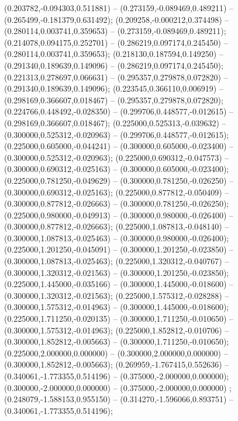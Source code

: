  (0.203782,-0.094303,0.511881) -- (0.273159,-0.089469,0.489211) -- (0.265499,-0.181379,0.631492);
 (0.209258,-0.000212,0.374498) -- (0.280114,0.003741,0.359653) -- (0.273159,-0.089469,0.489211);
 (0.214078,0.094175,0.252701) -- (0.286219,0.097174,0.245450) -- (0.280114,0.003741,0.359653);
 (0.218130,0.187594,0.149250) -- (0.291340,0.189639,0.149096) -- (0.286219,0.097174,0.245450);
 (0.221313,0.278697,0.066631) -- (0.295357,0.279878,0.072820) -- (0.291340,0.189639,0.149096);
 (0.223545,0.366110,0.006919) -- (0.298169,0.366607,0.018467) -- (0.295357,0.279878,0.072820);
 (0.224766,0.448492,-0.028350) -- (0.299706,0.448577,-0.012615) -- (0.298169,0.366607,0.018467);
 (0.225000,0.525313,-0.039632) -- (0.300000,0.525312,-0.020963) -- (0.299706,0.448577,-0.012615);
 (0.225000,0.605000,-0.044241) -- (0.300000,0.605000,-0.023400) -- (0.300000,0.525312,-0.020963);
 (0.225000,0.690312,-0.047573) -- (0.300000,0.690312,-0.025163) -- (0.300000,0.605000,-0.023400);
 (0.225000,0.781250,-0.049629) -- (0.300000,0.781250,-0.026250) -- (0.300000,0.690312,-0.025163);
 (0.225000,0.877812,-0.050409) -- (0.300000,0.877812,-0.026663) -- (0.300000,0.781250,-0.026250);
 (0.225000,0.980000,-0.049913) -- (0.300000,0.980000,-0.026400) -- (0.300000,0.877812,-0.026663);
 (0.225000,1.087813,-0.048140) -- (0.300000,1.087813,-0.025463) -- (0.300000,0.980000,-0.026400);
 (0.225000,1.201250,-0.045091) -- (0.300000,1.201250,-0.023850) -- (0.300000,1.087813,-0.025463);
 (0.225000,1.320312,-0.040767) -- (0.300000,1.320312,-0.021563) -- (0.300000,1.201250,-0.023850);
 (0.225000,1.445000,-0.035166) -- (0.300000,1.445000,-0.018600) -- (0.300000,1.320312,-0.021563);
 (0.225000,1.575312,-0.028288) -- (0.300000,1.575312,-0.014963) -- (0.300000,1.445000,-0.018600);
 (0.225000,1.711250,-0.020135) -- (0.300000,1.711250,-0.010650) -- (0.300000,1.575312,-0.014963);
 (0.225000,1.852812,-0.010706) -- (0.300000,1.852812,-0.005663) -- (0.300000,1.711250,-0.010650);
 (0.225000,2.000000,0.000000) -- (0.300000,2.000000,0.000000) -- (0.300000,1.852812,-0.005663);
 (0.269959,-1.767415,0.552636) -- (0.340061,-1.773355,0.514196) -- (0.375000,-2.000000,0.000000);
 (0.300000,-2.000000,0.000000) -- (0.375000,-2.000000,0.000000) ;
 (0.248079,-1.588153,0.955150) -- (0.314270,-1.596066,0.893751) -- (0.340061,-1.773355,0.514196);
